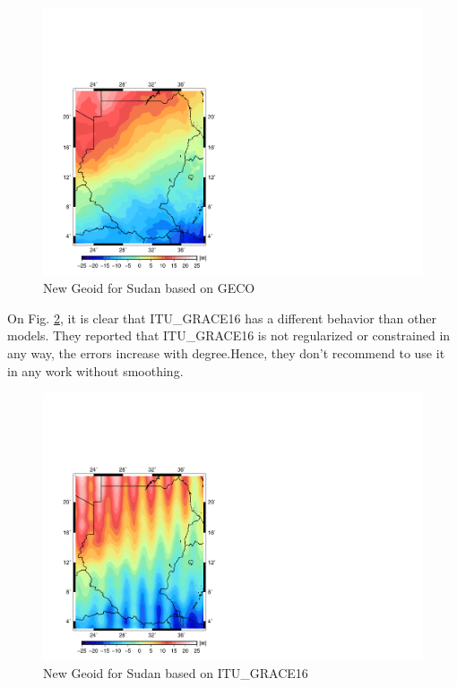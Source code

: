             \begin{figure}[t]
                  	\caption{New Geoid for Sudan based on GECO}
                  	\label{figure:datum_geco}
                  	\includegraphics{Figures/cropped_geco.pdf}
                  	\centering
            \end{figure}
            
On Fig. \ref{figure:datum_itugrace16}, it is clear that ITU\_GRACE16 has a different behavior than other models. They \cite{itugrace16} reported that ITU\_GRACE16 is not regularized or constrained in any way, the errors increase with degree.Hence, they don't recommend to use it in any work without smoothing. 
                    \begin{figure}[t]
                       	\caption{New Geoid for Sudan based on ITU\_GRACE16}
                       	\label{figure:datum_itugrace16}
                       	\includegraphics{Figures/cropped_itu_grace16.pdf}
                       	\centering
                    \end{figure}